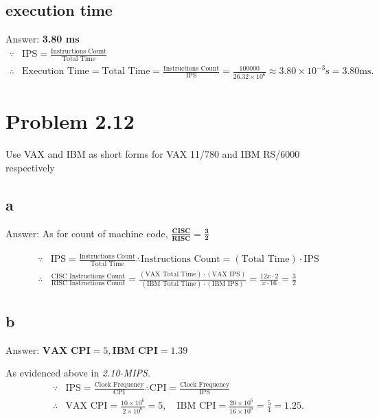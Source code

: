 \documentclass[11pt]{article}  %
\begin{document}
\subsection*{execution time}
    Answer: \textbf{3.80 ms}
    $$
    \begin{aligned}
        \because & \text{IPS} = \frac{\text{Instructions Count}}{\text{Total Time}} \\
        \therefore &\text{Execution Time} = \text{Total Time} = \frac{\text{Instructions Count}}{\text{IPS}} = 
            \frac{100000}{26.32 \times 10^6} \approx 3.80\times 10^{-3}\text{s} = 3.80\text{ms}.
    \end{aligned}
    $$

\section*{Problem 2.12}
    Use VAX and IBM as short forms for VAX 11/780 and IBM RS/6000 respectively
\subsection*{a}
    Answer: As for count of machine code, 
    $\displaystyle \mathbf{\frac{\textbf{CISC}}{\textbf{RISC}} = \frac{3}{2}}$

    $$
    \begin{aligned}
        \because  &\text{IPS} = \frac{\text{Instructions Count}}{\text{Total Time}} 
        \therefore \text{Instructions Count} = \left(\text{Total Time}\right) \cdot \text{IPS}\\
        \therefore &\frac{\text{CISC Instructions Count}}{\text{RISC Instructions Count}} = 
            \frac{\left(\text{VAX Total Time}\right) \cdot \left(\text{VAX IPS}\right)}
            {\left(\text{IBM Total Time}\right) \cdot \left(\text{IBM IPS}\right)}
            = \frac{12x\cdot 2}{x \cdot 16} = \frac{3}{2} 
    \end{aligned}
    $$

\subsection*{b}
    Answer: $\displaystyle \textbf{VAX CPI} = 5, \textbf{IBM CPI} = 1.39$

    As evidenced above in \textit{2.10-MIPS}.
    $$
    \begin{aligned}
        \because & \text{IPS} = \frac{\text{Clock Frequency}}{\text{CPI}}
        \therefore \text{CPI} = \frac{\text{Clock Frequency}}{\text{IPS}} \\ 
        \therefore &\text{VAX CPI} = \frac{10\times 10^6}{2\times 10^6} = 5, \quad
        \text{IBM CPI} = \frac{20\times 10^6}{16\times 10^6} = \frac{5}{4} = 1.25. 
    \end{aligned}
    $$
\end{document}
